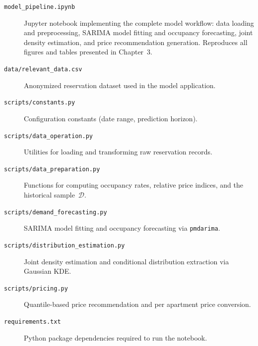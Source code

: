 \documentclass[12pt,a4paper]{report}
\begin{document}
\begin{description}
    \item[\texttt{model\_pipeline.ipynb}] Jupyter notebook implementing the complete model workflow: data loading and preprocessing, SARIMA model fitting and occupancy forecasting, joint density estimation, and price recommendation generation. Reproduces all figures and tables presented in Chapter~3.
    \item[\texttt{data/relevant\_data.csv}] Anonymized reservation dataset used in the model application.
    \item[\texttt{scripts/constants.py}] Configuration constants (date range, prediction horizon).
    \item[\texttt{scripts/data\_operation.py}] Utilities for loading and transforming raw reservation records.
    \item[\texttt{scripts/data\_preparation.py}] Functions for computing occupancy rates, relative price indices, and the historical sample~$\mathcal{D}$.
    \item[\texttt{scripts/demand\_forecasting.py}] SARIMA model fitting and occupancy forecasting via \texttt{pmdarima}.
    \item[\texttt{scripts/distribution\_estimation.py}] Joint density estimation and conditional distribution extraction via Gaussian KDE.
    \item[\texttt{scripts/pricing.py}] Quantile-based price recommendation and per apartment price conversion.
    \item[\texttt{requirements.txt}] Python package dependencies required to run the notebook.
\end{description}
\end{document}
